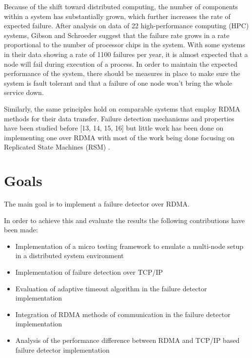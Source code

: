 \documentclass[bsc,frontabs,twoside,singlespacing,parskip,deptreport,hidel]{infthesis}     %
\begin{document}
Because of the shift toward distributed computing, the number of components within a system has substantially grown, which further increases the rate of expected failure. After analysis on data of 22 high-performance computing (HPC) systems, Gibson and Schroeder \cite{schroeder2007understanding} suggest that the failure rate grows in a rate proportional to the number of processor chips in the system. With some systems in their data showing a rate of 1100 failures per year, it is almost expected that a node will fail during execution of a process. In order to maintain the expected performance of the system, there should be measures in place to make sure the system is fault tolerant and that a failure of one node won't bring the whole service down.

Similarly, the same principles hold on comparable systems that employ RDMA methods for their data transfer. Failure detection mechanisms and properties have been studied before [13, 14, 15, 16] but little work has been done on implementing one over RDMA with most of the work being done focusing on Replicated State Machines (RSM) \cite{poke2015dare}.


\section{Goals}

The main goal is to implement a failure detector over RDMA.

In order to achieve this and evaluate the results the following contributions have been made:

\begin{itemize}
  \item Implementation of a micro testing framework to emulate a multi-node setup in a distributed system environment
  \item Implementation of failure detection over TCP/IP
  \item Evaluation of adaptive timeout algorithm in the failure detector implementation
  \item Integration of RDMA methods of communication in the failure detector implementation
  \item Analysis of the performance difference between RDMA and TCP/IP based failure detector implementation
\end{itemize}
\end{document}
